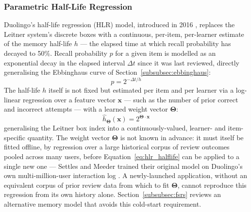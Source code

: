         \subsubsection{Parametric Half-Life Regression}
        \label{subsubsec:hlr}
        Duolingo's half-life regression (HLR) model, introduced in 2016 \cite{settles2016trainable}, replaces the Leitner system's discrete boxes with a continuous, per-item, per-learner estimate of the memory half-life $h$ --- the elapsed time at which recall probability has decayed to 50\%. Recall probability $p$ for a given item is modelled as an exponential decay in the elapsed interval $\Delta t$ since it was last reviewed, directly generalising the Ebbinghaus curve of Section~\ref{subsubsec:ebbinghaus}:
        \begin{equation}
            \label{eq:hlr_recall}
            p = 2^{-\Delta t / h}
        \end{equation}
        The half-life $h$ itself is not fixed but estimated per item and per learner via a log-linear regression over a feature vector $\mathbf{x}$ --- such as the number of prior correct and incorrect attempts --- with a learned weight vector $\boldsymbol{\Theta}$:
        \begin{equation}
            \label{eq:hlr_halflife}
            \hat{h}_{\boldsymbol{\Theta}}(\mathbf{x}) = 2^{\boldsymbol{\Theta} \cdot \mathbf{x}}
        \end{equation}
        generalising the Leitner box index into a continuously-valued, learner- and item-specific quantity. The weight vector $\boldsymbol{\Theta}$ is not known in advance: it must itself be fitted offline, by regression over a large historical corpus of review outcomes pooled across many users, before Equation~\ref{eq:hlr_halflife} can be applied to a single new one --- Settles and Meeder trained their original model on Duolingo's own multi-million-user interaction log \cite{settles2016trainable}. A newly-launched application, without an equivalent corpus of prior review data from which to fit $\boldsymbol{\Theta}$, cannot reproduce this regression from its own history alone. Section~\ref{subsubsec:fsrs} reviews an alternative memory model that avoids this cold-start requirement.

